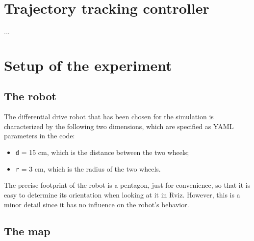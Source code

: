 \documentclass[11pt,a4paper]{article}
\begin{document}

\section{Trajectory tracking controller}

...



\section{Setup of the experiment}



\subsection{The robot}

The differential drive robot that has been chosen for the simulation is characterized by the following
two dimensions, which are specified as YAML parameters in the code:
\begin{itemize}
    \item \texttt{d} = 15 cm, which is the distance between the two wheels;
    \item \texttt{r} = 3 cm, which is the radius of the two wheels.\\
\end{itemize}

The precise footprint of the robot is a pentagon, just for convenience, so that it is easy to determine its
orientation when looking at it in Rviz.
However, this is a minor detail since it has no influence on the robot's behavior.



\subsection{The map}
\end{document}
